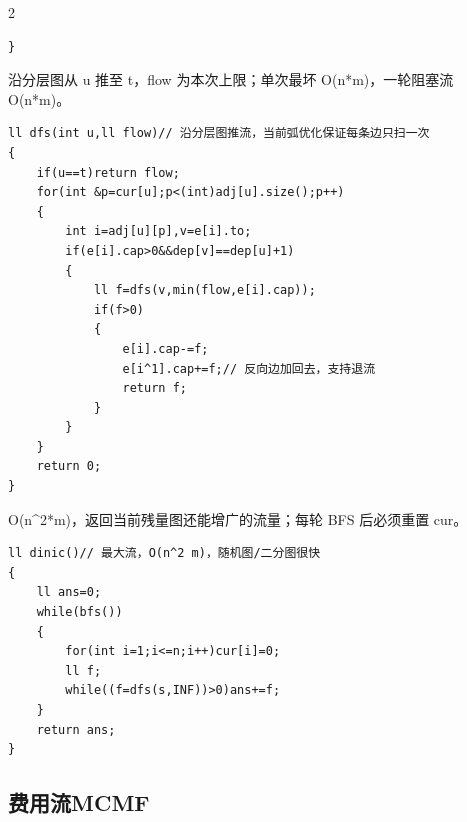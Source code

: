 \documentclass[UTF8,fontset=fandol,a4paper,twoside]{ctexart}
\newcommand{\note}[1]{{\fontsize{10}{12}\selectfont #1\par}}
\begin{document}
\begin{multicols}{2}
\begin{lstlisting}
}
\end{lstlisting}
\note{沿分层图从 u 推至 t，flow 为本次上限；单次最坏 O(\allowbreak{}n*m)\allowbreak{}，一轮阻塞流 O(\allowbreak{}n*m)\allowbreak{}。}
\begin{lstlisting}
ll dfs(int u,ll flow)// 沿分层图推流，当前弧优化保证每条边只扫一次
{
    if(u==t)return flow;
    for(int &p=cur[u];p<(int)adj[u].size();p++)
    {
        int i=adj[u][p],v=e[i].to;
        if(e[i].cap>0&&dep[v]==dep[u]+1)
        {
            ll f=dfs(v,min(flow,e[i].cap));
            if(f>0)
            {
                e[i].cap-=f;
                e[i^1].cap+=f;// 反向边加回去，支持退流
                return f;
            }
        }
    }
    return 0;
}
\end{lstlisting}
\note{O(\allowbreak{}n\textasciicircum{}2*m)\allowbreak{}，返回当前残量图还能增广的流量；每轮 BFS 后必须重置 cur。}
\begin{lstlisting}
ll dinic()// 最大流，O(n^2 m)，随机图/二分图很快
{
    ll ans=0;
    while(bfs())
    {
        for(int i=1;i<=n;i++)cur[i]=0;
        ll f;
        while((f=dfs(s,INF))>0)ans+=f;
    }
    return ans;
}
\end{lstlisting}
\subsection{费用流MCMF}


\end{multicols}
\end{document}
